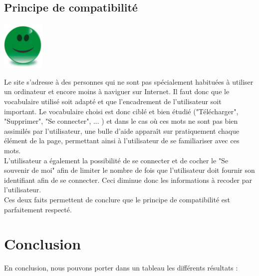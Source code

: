 \documentclass{article}
\begin{document}
\begin{sffamily}
\subsection{Principe de compatibilité}

\includegraphics[scale=0.27]{good.png}

Le site s'adresse à des personnes qui ne sont pas spécialement habituées à utiliser un ordinateur et encore moins à naviguer sur Internet. Il faut donc que le vocabulaire 
utilisé soit adapté et que l'encadrement de l'utilisateur soit important. Le vocabulaire choisi est donc ciblé et bien étudié ("Télécharger", "Supprimer", "Se connecter", 
... ) et dans le cas où ces mots ne sont pas bien assimilés par l'utilisateur, une bulle d'aide apparaît sur pratiquement chaque élément de la page, permettant ainsi à 
l'utilisateur de se familiariser avec ces mots. \\

L'utilisateur a également la possibilité de se connecter et de cocher le "Se souvenir de moi" afin de limiter le nombre de fois que l'utilisateur doit fournir son 
identifiant afin de se connecter. Ceci diminue donc les informations à recoder par l'utilisateur.\\

Ces deux faits permettent de conclure que le principe de compatibilité est parfaitement respecté.

\newpage

\section{Conclusion}

En conclusion, nous pouvons porter dans un tableau les différents résultats :


\end{sffamily}
\end{document}
